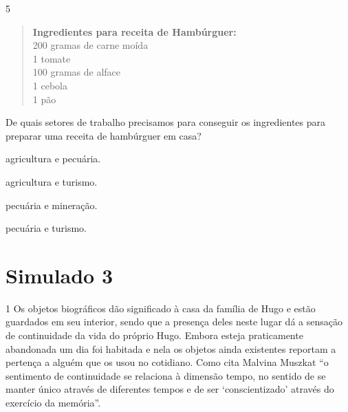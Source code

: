 \num{5}

\begin{quote}
\textbf{Ingredientes para receita de Hambúrguer:}\\
200 gramas de carne moída\\
1 tomate\\
100 gramas de alface\\
1 cebola\\
1 pão
\end{quote}

De quais setores de trabalho precisamos para conseguir os ingredientes
para preparar uma receita de hambúrguer em casa?

\begin{escolha}
\item agricultura e pecuária.

\item agricultura e turismo.

\item pecuária e mineração.

\item pecuária e turismo.
\end{escolha}


\chapter{Simulado 3}

\num{1} Os objetos biográficos dão significado à casa da família de Hugo e
estão guardados em seu interior, sendo que a presença deles neste lugar
dá a sensação de continuidade da vida do próprio Hugo. Embora esteja
praticamente abandonada um dia foi habitada e nela os objetos ainda
existentes reportam a pertença a alguém que os usou no cotidiano. Como
cita Malvina Muszkat ``o sentimento de continuidade se relaciona à
dimensão tempo, no sentido de se manter único através de diferentes
tempos e de ser `conscientizado' através do exercício da memória''.

